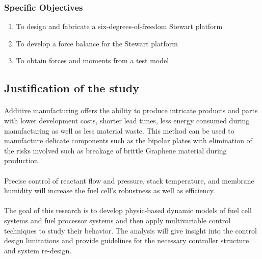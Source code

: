 \subsubsection{Specific Objectives}
\begin{enumerate}
\item To design and fabricate a six-degrees-of-freedom Stewart platform
\item To develop a force balance for the Stewart platform
\item To obtain forces and moments from a test model
\end{enumerate}
\subsection{Justification of the study}
\paragraph{}Additive manufacturing offers the ability to produce intricate products and parts with lower development costs, shorter lead times, less energy consumed during manufacturing as well as less material waste. This method can be used to manufacture delicate components such as the bipolar plates with elimination of the risks involved such as breakage of brittle Graphene material during production.     
\paragraph{}Precise control of reactant flow and pressure, stack temperature, and membrane humidity will increase the fuel cell’s robustness as well as efficiency.
\paragraph{}The goal of this research is to develop physic-based dynamic models of fuel cell systems and fuel processor systems and then apply multivariable control techniques to study their behavior. The analysis will give insight into the control design limitations and provide guidelines for the necessary controller structure and system re-design.

